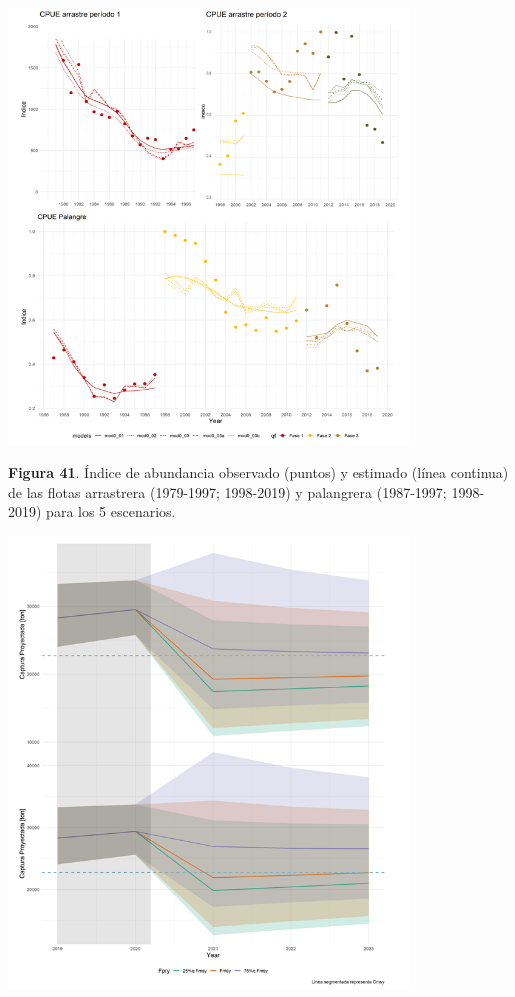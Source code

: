 \documentclass[
  spanish,
]{article}
\begin{document}
\begin{center}
\includegraphics[width=0.8\textwidth]{Figuras/Figura_41.png}
\end{center}

\small \textbf{Figura 41}. Índice de abundancia observado (puntos) y
estimado (línea continua) de las flotas arrastrera (1979-1997;
1998-2019) y palangrera (1987-1997; 1998-2019) para los 5 escenarios.
\vspace{0.5cm} \normalsize

\begin{center}
\includegraphics[width=0.8\textwidth]{Figuras/Figura_42.png}
\end{center}
\end{document}
